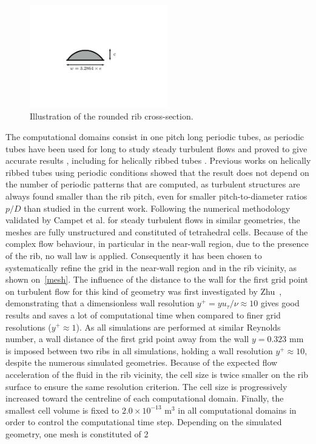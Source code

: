 \begin{figure}[ht]
\centering
\includegraphics[width=6cm]{fig/applications/optim/rib_shape.pdf}
\caption{Illustration of the rounded rib cross-section.}
\label{rib}
\end{figure}

The computational domains consist in one pitch long periodic tubes, as periodic tubes have been used for long to study steady turbulent flows and proved to give accurate results \cite{rogallo1984,kim1987,JimenezMoin1991}, including for helically ribbed tubes \cite{campet2018}. Previous works on helically ribbed tubes using periodic conditions \cite{Zhu2015,campet2018} showed that the result does not depend on the number of periodic patterns that are computed, as turbulent structures are always found smaller than the rib pitch, even for smaller pitch-to-diameter ratios $p/D$ than studied in the current work. Following the numerical methodology validated by Campet et al. \cite{campet2018} for steady turbulent flows in similar geometries, the meshes are fully unstructured and constituted of tetrahedral cells. Because of the complex flow behaviour, in particular in the near-wall region, due to the presence of the rib, no wall law is applied. Consequently it has been chosen to systematically refine the grid in the near-wall region and in the rib vicinity, as shown on~\cref{mesh}. The influence of the distance to the wall for the first grid point on turbulent flow for this kind of geometry was first investigated by Zhu~\cite{Zhu2015}, demonstrating that a dimensionless wall resolution $y^+ = y u_{\tau} / \nu \approx 10$ gives good results and saves a lot of computational time when compared to finer grid resolutions ($y^+ \approx 1$). As all simulations are performed at similar Reynolds number, a wall distance of the first grid point away from the wall $y = 0.323$ mm is imposed between two ribs in all simulations, holding a wall resolution $y^+ \approx 10$, despite the numerous simulated geometries. Because of the expected flow acceleration of the fluid in the rib vicinity, the cell size is twice smaller on the rib surface to ensure the same resolution criterion. The cell size is progressively increased toward the centreline of each computational domain. Finally, the smallest cell volume is fixed to $2.0 \times 10^{-13}$ m$^3$ in all computational domains in order to control the computational time step. Depending on the simulated geometry, one mesh is constituted of 2 